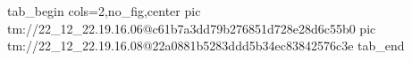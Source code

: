  
 
 
 
 

\qqSecOrig


\ifcmt
  tab_begin cols=2,no_fig,center
    pic tm://22_12_22.19.16.06@c61b7a3dd79b276851d728e28d6c55b0
    pic tm://22_12_22.19.16.08@22a0881b5283ddd5b34ec83842576c3e
  tab_end
\fi

